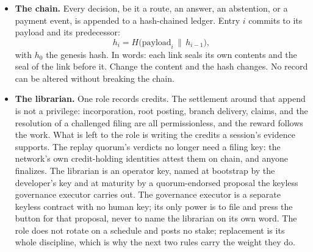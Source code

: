 \documentclass[11pt]{article}
\begin{document}
\begin{itemize}
    \item \textbf{The chain.} Every decision, be it a route, an answer, an
          abstention, or a payment event, is appended to a hash-chained
          ledger. Entry $i$ commits to its payload and its predecessor:
          \begin{equation}
              h_i = H\bigl(\mathrm{payload}_i \,\|\, h_{i-1}\bigr),
          \end{equation}
          with $h_0$ the genesis hash. In words: each link seals its own
          contents and the seal of the link before it. Change the content
          and the hash changes. No record can be altered without breaking
          the chain.
    \item \textbf{The librarian.} One role records credits. The
          settlement around that append is not a privilege: incorporation,
          root posting, branch delivery, claims, and the resolution of a
          challenged filing are all permissionless, and the reward follows
          the work. What is left to the role is writing the credits a
          session's evidence supports. The replay quorum's verdicts no
          longer need a filing key: the network's own credit-holding
          identities attest them on chain, and anyone finalizes. The
          librarian is an operator key,
          named at bootstrap by the developer's key and at maturity by a
          quorum-endorsed proposal the keyless governance executor carries
          out. The governance executor is a separate
          keyless contract with no human key; its only power is to file
          and press the button for that proposal, never to name the
          librarian on its own word. The role does not rotate on a
          schedule and posts no stake; replacement is its whole
          discipline, which is why the next two rules carry the weight they
          do.


\end{itemize}
\end{document}

